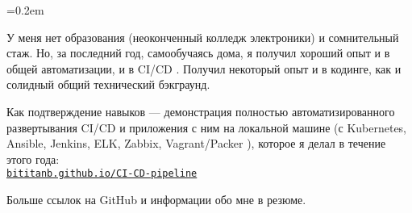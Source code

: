 \documentclass[12pt, a4paper]{article}
\newcommand{\Delimitline}{
  \vspace{-1ex}
  \noindent\makebox[\linewidth]{\rule{\DelimitlineLength}{0.12ex}} 
  \vspace{3ex}
}
\newcommand\rurl[1]{%
  \-\hspace{0.5em}
  \href{http://#1}{\nolinkurl{#1}}%
}
\newcommand\Eng[1]{%
  \foreignlanguage{english}{#1}%
}
\newcommand{\forceindent}{\leavevmode{\parindent=1.5em\indent}}
\begin{document}
\sffamily

\font=0.2em

\newlength{\DelimitlineLength}
\setlength{\DelimitlineLength}{\textwidth+1em}

\pagecolor[RGB]{245,245,245}

{}

\Delimitline

\forceindent У меня нет образования (неоконченный колледж электроники) и сомнительный стаж.
Но, за последний год, самообучаясь дома, я получил хороший опыт и в общей автоматизации, и в \Eng{CI/CD}. 
Получил некоторый опыт и в кодинге, как и солидный общий технический бэкграунд.

\forceindent Как подтверждение навыков — демонстрация полностью автоматизированного развертывания \Eng{CI/CD} и приложения с ним
на локальной машине (с \Eng{Kubernetes, Ansible, Jenkins, ELK, Zabbix, Vagrant/Packer}), которое я делал в течение этого года:
\vspace{0.8ex}\\
  \rurl{bititanb.github.io/CI-CD-pipeline}

Больше ссылок на GitHub и информации обо мне в резюме.
\end{document}
